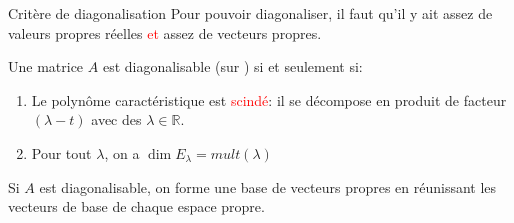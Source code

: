 \begin{parag}{Critère de diagonalisation}
    Pour pouvoir diagonaliser, il faut qu'il y ait assez de valeurs propres réelles \textcolor{red}{et} assez de vecteurs propres.
    \begin{theoreme}
        Une matrice $A$ est diagonalisable (sur \R) si et seulement si:
        \begin{enumerate}
            \item Le polynôme caractéristique est \textcolor{red}{scindé}: il se décompose en produit de facteur $(\lambda - t)$ avec des $\lambda \in \mathbb{R}$.
            \item Pour tout $\lambda$, on a $\dim E_\lambda = mult(\lambda)$
        \end{enumerate}
        Si $A$ est diagonalisable, on forme une base de vecteurs propres en réunissant les vecteurs de base de chaque espace propre.
        

\end{theoreme}
\end{parag}
